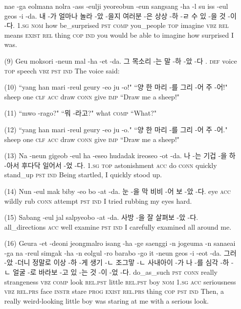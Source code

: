 \begin{itemize}
\tgl
		{nae -ga eolmana nolra -ass -eulji yeoreobun -eun sangsang -ha -l su iss -eul geos -i -da.}
		{내 -가 얼마나 놀라 -았 -을지 여러분 -은 상상 -하 -ㄹ 수 있 -을 것 -이 -다.}
		{\textsc{1.sg}	\textsc{nom}	how	be\_surprised	\textsc{pst}	\textsc{comp}	you\_people	\textsc{top}	imagine	\textsc{vbz}	\textsc{rel}	means	\textsc{exist}	\textsc{rel}	thing	\textsc{cop}	\textsc{ind}}
		{you would be able to imagine how surprised I was.}
		

\item [(9)]
\tgl
		{Geu moksori -neun mal -ha -et -da.}
		{그 목소리 -는 말 -하 -았 -다 .}
		{\textsc{def}	voice	\textsc{top}	speech	\textsc{vbz}	\textsc{pst}	\textsc{ind}}
		{The voice said:}
		
\item [(10)]
\tgl
		{``yang han mari -reul geury -eo ju -o!"}
		{``양 한 마리 -를 그리 -어 주 -어!"}
		{sheep	one	\textsc{clf}	\textsc{acc}	draw	\textsc{conn}	give	\textsc{imp}}
		{``Draw me a sheep!"}

\item [(11)]
\tgl
		{``mwo -rago?"}
		{``뭐 -라고?"}
		{what	\textsc{comp}}
		{``What?"}
		
\item [(12)]
\tgl
		{``yang han mari -reul geury -eo ju -o."}
		{``양 한 마리 -를 그리 -어 주 -어."}
		{sheep	one	\textsc{clf}	\textsc{acc}	draw	\textsc{conn}	give	\textsc{imp}}
		{``Draw me a sheep!"}
		
\item [(13)]
\tgl
		{Na -neun gigeob -eul ha -eseo hudadak ireoseo -ot -da.}
		{나 -는 기겁 -을 하 -아서 후다닥 일어서 -었 -다.}
		{\textsc{1.sg}	\textsc{top}	astonishment	\textsc{acc}	do	\textsc{conn}	quickly	stand\_up	\textsc{pst}	\textsc{ind}}
		{Being startled, I quickly stood up.}
		
\item [(14)]
\tgl
		{Nun -eul mak biby -eo bo -at -da.}
		{눈 -을 막 비비 -어 보 -았 -다.}
		{eye	\textsc{acc}	wildly	rub	\textsc{conn}	attempt	\textsc{pst}	\textsc{ind}}
		{I tried rubbing my eyes hard.}
		
\item [(15)]
\tgl
		{Sabang -eul jal salpyeobo -at -da.}
		{사방 -을 잘 살펴보 -았 -다.}
		{all\_directions	\textsc{acc}	well	examine	\textsc{pst}	\textsc{ind}}
		{I carefully examined all around me.}
		
\item [(16)]
\tgl
		{Geura -et -deoni jeongmalro isang -ha -ge saenggi -n jogeuma -n sanaeai -ga na -reul simgak -ha -n eolgul -ro barabo -go it -neun geos -i -eot -da.}
		{그러 -았 -더니 정말로 이상 -하 -게 생기 -ㄴ 조그맣 -ㄴ 사내아이 -가 나 -를 심각 -하 -ㄴ 얼굴 -로 바라보 -고 있 -는 것 -이 -었 -다.}
		{do\_as\_such	\textsc{pst}	\textsc{conn}	really	strangeness	\textsc{vbz}	\textsc{comp}	look	\textsc{rel.pst}	little	\textsc{rel.pst}	boy	\textsc{nom}	\textsc{1.sg}	\textsc{acc}	seriousness	\textsc{vbz}	\textsc{rel.prs}	face	\textsc{instr}	stare	\textsc{prog}	\textsc{exist}	\textsc{rel.prs}	thing	\textsc{cop}	\textsc{pst}	\textsc{ind}}
		{Then, a really weird-looking little boy was staring at me with a serious look.}
		

\end{itemize}
